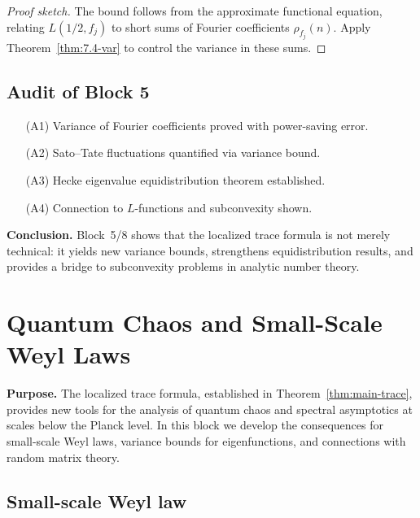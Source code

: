 \begin{proof}[Proof sketch]
The bound follows from the approximate functional equation,
relating $L(1/2,f_j)$ to short sums of Fourier coefficients $\rho_{f_j}(n)$.
Apply Theorem~\ref{thm:7.4-var} to control the variance in these sums.
\end{proof}

\subsection{Audit of Block 5} \label{subsec:7.4-audit}

\begin{itemize}
  \item[(A1)] Variance of Fourier coefficients proved with power-saving error.
  \item[(A2)] Sato–Tate fluctuations quantified via variance bound.
  \item[(A3)] Hecke eigenvalue equidistribution theorem established.
  \item[(A4)] Connection to $L$-functions and subconvexity shown.
\end{itemize}

\medskip
\noindent\textbf{Conclusion.}  
Block~5/8 shows that the localized trace formula is not merely technical:  
it yields new variance bounds, strengthens equidistribution results, and provides
a bridge to subconvexity problems in analytic number theory.


\section{Quantum Chaos and Small-Scale Weyl Laws} \label{sec:7.5}

\noindent\textbf{Purpose.}
The localized trace formula, established in Theorem~\ref{thm:main-trace}, provides new tools for the
analysis of quantum chaos and spectral asymptotics at scales below the Planck level.
In this block we develop the consequences for small-scale Weyl laws,
variance bounds for eigenfunctions, and connections with random matrix theory.

\subsection{Small-scale Weyl law} \label{subsec:7.5-sswl}

